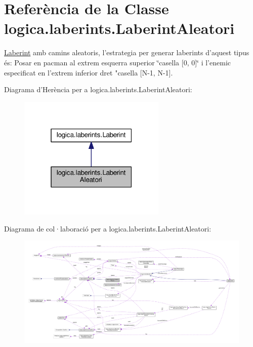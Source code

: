 \hypertarget{classlogica_1_1laberints_1_1_laberint_aleatori}{\section{Referència de la Classe logica.\+laberints.\+Laberint\+Aleatori}
\label{classlogica_1_1laberints_1_1_laberint_aleatori}
}


\hyperlink{classlogica_1_1laberints_1_1_laberint}{Laberint} amb camins aleatoris, l'estrategia per generar laberints d'aquest tipus és\+: Posar en pacman al extrem esquerra superior \char`\"{}casella \mbox{[}0, 0\mbox{]}\char`\"{} i l'enemic especificat en l'extrem inferior dret "casella \mbox{[}N-\/1, N-\/1\mbox{]}.  




Diagrama d'Herència per a logica.\+laberints.\+Laberint\+Aleatori\+:
\nopagebreak
\begin{figure}[H]
\begin{center}
\leavevmode
\includegraphics[width=199pt]{classlogica_1_1laberints_1_1_laberint_aleatori__inherit__graph}
\end{center}
\end{figure}


Diagrama de col·laboració per a logica.\+laberints.\+Laberint\+Aleatori\+:
\nopagebreak
\begin{figure}[H]
\begin{center}
\leavevmode
\includegraphics[width=350pt]{classlogica_1_1laberints_1_1_laberint_aleatori__coll__graph}
\end{center}
\end{figure}
